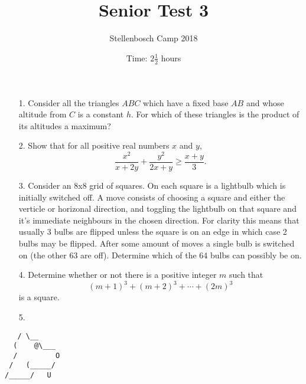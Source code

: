 \documentclass[a4paper, 11pt]{article}
\title{Senior Test 3}
\author{Stellenbosch Camp 2018}
\date{Time: $2 \frac{1}{2}$ hours}
\begin{document}
 \vspace{-48pt} \maketitle

\begin{enumerate}

\item[1.] Consider all the triangles $ABC$ which have a fixed base $AB$ and whose altitude from $C$ is a constant $h$. For which of these triangles is the product of its altitudes a maximum? 


\vspace{6pt}
\item[2.]
Show that for all positive real numbers $x$ and $y$, \[ \frac{x^2}{x+2y} +\frac{y^2}{2x+y} \geq \frac{x+y}{3}. \]


\item[3.]
Consider an 8x8 grid of squares. On each square is a lightbulb which is initially switched off. A move consists of choosing a square and either the verticle or horizonal direction, and toggling the lightbulb on that square and it's immediate neighbours in the chosen direction. For clarity this means that usually 3 bulbs are flipped unless the square is on an edge in which case 2 bulbs may be flipped. After some amount of moves a single bulb is switched on (the other 63 are off). Determine which of the 64 bulbs can possibly be on. 


\vspace{6pt}
\item[4.]
Determine whether or not there is a positive integer $m$ such that \[ (m+1)^3 +(m+2)^3 +\dotsb +(2m)^3 \] is a square.


\vspace{6pt}
% 
\item[5.]


\end{enumerate}

\vfill

\centering
\begin{BVerbatim}
   / \__
  (    @\___
  /         O
 /   (_____/
/_____/   U
\end{BVerbatim}

\vspace{12mm}
\end{document}
